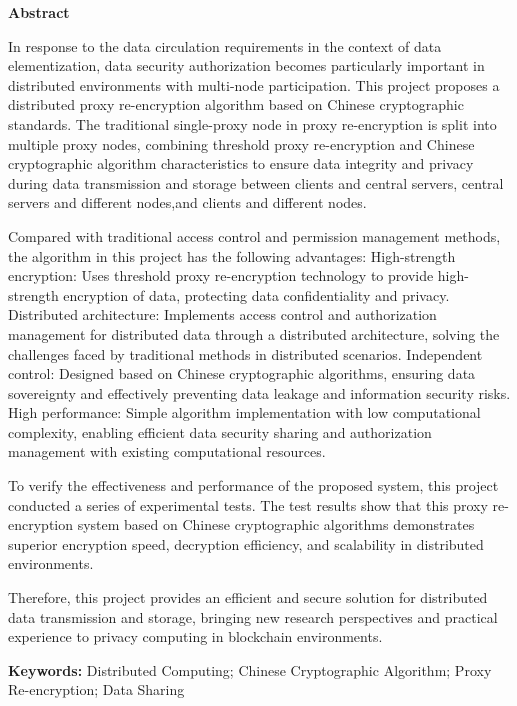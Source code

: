 \begin{center}\heiti\sanhao\textbf{
		Abstract
	}
\end{center}

In response to the data circulation requirements in the context of data elementization,
data security authorization becomes particularly important in distributed environments with multi-node participation.
This project proposes a distributed proxy re-encryption algorithm based on Chinese cryptographic standards.
The traditional single-proxy node in proxy re-encryption is split into multiple proxy nodes,
combining threshold proxy re-encryption and Chinese cryptographic algorithm characteristics to
ensure data integrity and privacy during data transmission and storage between clients and central servers,
central servers and different nodes,and clients and different nodes.

Compared with traditional access control and permission management methods,
the algorithm in this project has the following advantages:
High-strength encryption:
Uses threshold proxy re-encryption technology to provide high-strength encryption of data,
protecting data confidentiality and privacy.
Distributed architecture:
Implements access control and authorization management for distributed data through a distributed architecture,
solving the challenges faced by traditional methods in distributed scenarios.
Independent control:
Designed based on Chinese cryptographic algorithms,
ensuring data sovereignty and effectively preventing data leakage and information security risks.
High performance:
Simple algorithm implementation with low computational complexity,
enabling efficient data security sharing and authorization management with existing computational resources.

To verify the effectiveness and performance of the proposed system,
this project conducted a series of experimental tests.
The test results show that this proxy re-encryption system based on
Chinese cryptographic algorithms demonstrates superior encryption speed,
decryption efficiency, and scalability in distributed environments.

Therefore, this project provides an efficient and secure solution for distributed data transmission and storage,
bringing new research perspectives and practical experience to privacy computing in blockchain environments.

\textbf{Keywords:} Distributed Computing; Chinese Cryptographic Algorithm; Proxy Re-encryption; Data Sharing

\newpage\quad %
\clearpage
